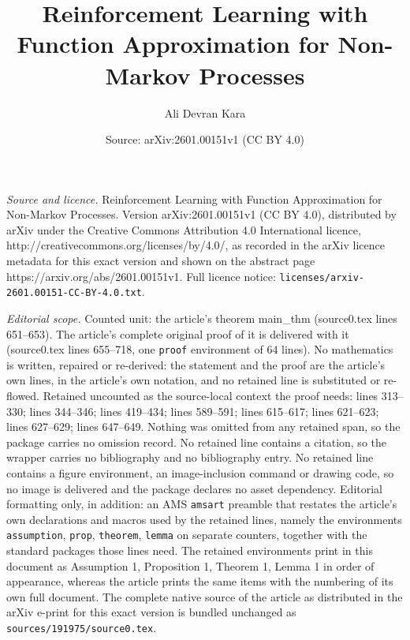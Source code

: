\documentclass[10pt,a4paper]{amsart}
\title{Reinforcement Learning with Function Approximation for Non-Markov Processes}
\author{Ali Devran Kara}
\date{Source: arXiv:2601.00151v1 (CC BY 4.0)}
\begin{document}
\maketitle

\noindent\emph{Source and licence.} Reinforcement Learning with Function Approximation for Non-Markov Processes. Version arXiv:2601.00151v1 (CC BY 4.0), distributed by arXiv under the Creative Commons Attribution 4.0 International licence, http://creativecommons.org/licenses/by/4.0/, as recorded in the arXiv licence metadata for this exact version and shown on the abstract page https://arxiv.org/abs/2601.00151v1. Full licence notice: \texttt{licenses/arxiv-2601.00151-CC-BY-4.0.txt}.\par\smallskip

\noindent\textit{Editorial scope.} Counted unit: the article's theorem main\_thm (source0.tex lines 651--653). The article's complete original proof of it is delivered with it (source0.tex lines 655--718, one \texttt{proof} environment of 64 lines). No mathematics is written, repaired or re-derived: the statement and the proof are the article's own lines, in the article's own notation, and no retained line is substituted or re-flowed.  Retained uncounted as the source-local context the proof needs: lines 313--330; lines 344--346; lines 419--434; lines 589--591; lines 615--617; lines 621--623; lines 627--629; lines 647--649.  Nothing was omitted from any retained span, so the package carries no omission record.  No retained line contains a citation, so the wrapper carries no bibliography and no bibliography entry.  No retained line contains a figure environment, an image-inclusion command or drawing code, so no image is delivered and the package declares no asset dependency.  Editorial formatting only, in addition: an AMS \texttt{amsart} preamble that restates the article's own declarations and macros used by the retained lines, namely the environments \texttt{assumption}, \texttt{prop}, \texttt{theorem}, \texttt{lemma} on separate counters, together with the standard packages those lines need.  The retained environments print in this document as Assumption 1, Proposition 1, Theorem 1, Lemma 1 in order of appearance, whereas the article prints the same items with the numbering of its own full document.  The complete native source of the article as distributed in the arXiv e-print for this exact version is bundled unchanged as \texttt{sources/191975/source0.tex}.
\end{document}
